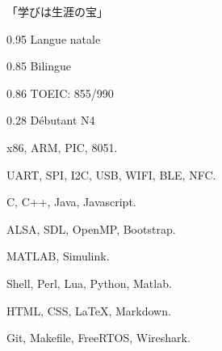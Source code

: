 \documentclass{faresume}
\begin{document}
\begin{column}[\rightcolumnwidth]


		\addcontent
		{
			{\Large\begin{CJK}{UTF8}{min}「学びは生涯の宝」\end{CJK}}
		}{}{}{}{}


		{}{}{}{}

		{}{}{}{}

		{}{}{}{}

		{}{}{}{}

		{}{}{}{}


			{0.95}
			{Langue natale}
			{}{}{}

			{0.85}
			{Bilingue}
			{}{}{}

			{0.86}
			{TOEIC: 855/990}
			{}{}{}

			{0.28}
			{D\'ebutant N4}
			{}{}{}


			{x86, ARM, PIC, 8051.}
			{}{}{}{}

			{UART, SPI, I2C, USB, WIFI, BLE, NFC.}
			{}{}{}{}

			{C, C++, Java, Javascript.}
			{}{}{}{}

			{ALSA, SDL, OpenMP, Bootstrap.}
			{}{}{}{}

			{MATLAB, Simulink.}
			{}{}{}{}

			{Shell, Perl, Lua, Python, Matlab.}
			{}{}{}{}

			{HTML, CSS, {\LaTeX}, Markdown.}
			{}{}{}{}

			{Git, Makefile, FreeRTOS, Wireshark.}
			{}{}{}{}


\end{column}
\end{document}
